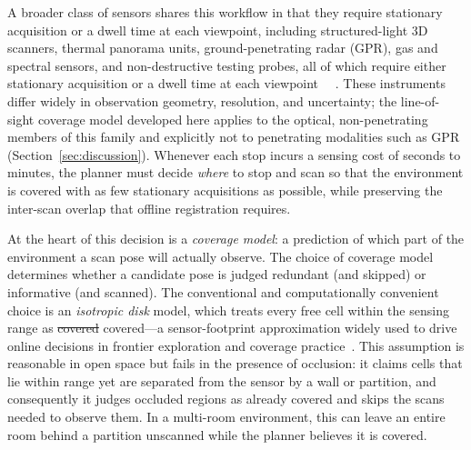 \documentclass[sensors,article,submit,pdftex,moreauthors]{Definitions/mdpi}
\providecommand{\DIFadd}[1]{{\protect\color{blue} \sf #1}} %
\providecommand{\DIFdel}[1]{{\protect\color{red}\protect\scriptsize\protect\sout{#1}}} %
\providecommand{\DIFdelNS}[1]{{\protect\color{red}\protect\scriptsize #1}} %
\providecommand{\DIFaddbegin}{} %
\providecommand{\DIFaddend}{} %
\providecommand{\DIFdelbegin}{} %
\providecommand{\DIFdelend}{} %
\begin{document}
\DIFadd{A broader class of sensors shares this workflow in that they require
stationary acquisition or a dwell time at each viewpoint}\DIFaddend , including
structured-light 3D scanners, thermal panorama units, ground-penetrating radar
\DIFaddbegin \DIFadd{(GPR)}\DIFaddend , gas and spectral sensors, and non-destructive testing
probes\DIFdelbegin \DIFdelNS{, all of which require either stationary acquisition or a dwell
time at each viewpoint~\cite{stopandgo-review,gas-coverage,robotic-ndt}}\DIFdelend \DIFaddbegin \DIFadd{~\cite{stopandgo-review,gas-coverage,robotic-ndt}. These instruments
differ widely in observation geometry, resolution, and uncertainty; the
line-of-sight coverage model developed here applies to the optical,
non-penetrating members of this family and explicitly not to penetrating
modalities such as GPR (Section~\ref{sec:discussion})}\DIFaddend . Whenever
each stop incurs a sensing cost of seconds to minutes, the planner must decide
\emph{where} to stop and scan so that the environment is covered with as few
stationary acquisitions as possible, while preserving the inter-scan overlap that
offline registration requires.

At the heart of this decision is a \emph{coverage model}: a prediction of which
part of the environment a scan pose will actually observe. The choice of
coverage model determines whether a candidate pose is judged redundant (and
skipped) or informative (and scanned). The conventional and computationally
convenient choice is an \emph{isotropic disk} model, which treats every free
cell within the sensing range as \DIFdelbegin \DIFdel{covered}\DIFdelend \DIFaddbegin \DIFadd{covered---a sensor-footprint approximation
widely used to drive online decisions in frontier exploration and coverage
practice~\cite{yamauchi1997,umari2017,choset2001,galceran2013,placed2023}}\DIFaddend . This assumption is reasonable in open
space but fails in the presence of occlusion: it claims cells that lie within
range yet are separated from the sensor by a wall or partition, and consequently
it judges occluded regions as already covered and skips the scans needed to
observe them. In a multi-room environment, this can leave an entire room behind
a partition unscanned while the planner believes it is covered.
\end{document}
